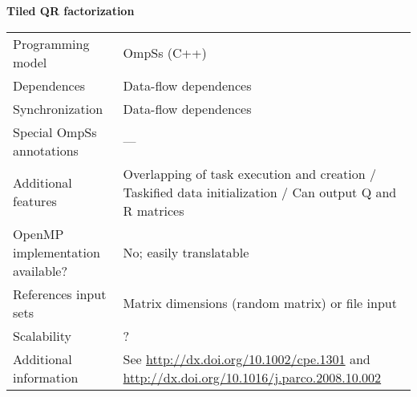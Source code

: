 \section*{}
\label{qr_tile}
\centering
\Huge
\textbf{Tiled QR factorization}

\begin{table}[h!]
  \large
  \centering
  \begin{tabular}{|l|l|}
    \hline
    Programming model                & OmpSs (C++) \\
    Dependences                      & Data-flow dependences \\
    Synchronization                  & Data-flow dependences \\
    Special OmpSs annotations        & --- \\
    Additional features              & Overlapping of task execution and creation / Taskified data initialization / Can output Q and R matrices \\
    OpenMP implementation available? & No; easily translatable \\
    References input sets            & Matrix dimensions (random matrix) or file input \\
    Scalability                      & ? \\
    Additional information           & See \url{http://dx.doi.org/10.1002/cpe.1301} and \url{http://dx.doi.org/10.1016/j.parco.2008.10.002} \\
    \hline
  \end{tabular}
\end{table}

\newpage
